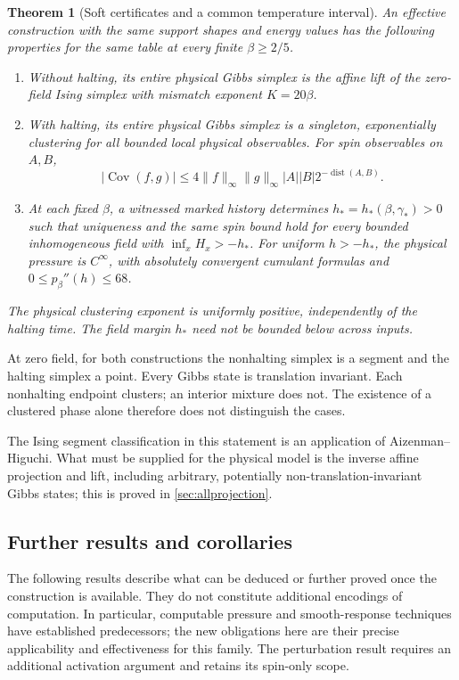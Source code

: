 \documentclass[11pt,reqno]{amsart}
\numberwithin{equation}{section}
\newtheorem{theorem}{Theorem}[section]
\theoremstyle{definition}
\theoremstyle{remark}
\newcommand{\Cov}{\operatorname{Cov}}
\newcommand{\dist}{\operatorname{dist}}
\newcommand{\norm}[1]{\lVert#1\rVert}
\begin{document}
\begin{theorem}[Soft certificates and a common temperature interval]\label{thm:soft}
An effective construction with the same support shapes and energy values has the following properties for the \emph{same table} at every finite $\beta\geq2/5$.
\begin{enumerate}
\item Without halting, its entire physical Gibbs simplex is the affine lift of the zero-field Ising simplex with mismatch exponent $K=20\beta$.
\item With halting, its entire physical Gibbs simplex is a singleton, exponentially clustering for all bounded local physical observables. For spin observables on $A,B$,
\begin{equation}\label{eq:maincov}
 |\Cov(f,g)|\leq4\norm f_\infty\norm g_\infty |A||B|2^{-\dist(A,B)}.
\end{equation}
\item At each fixed $\beta$, a witnessed marked history determines $h_*=h_*(\beta,\gamma_*)>0$ such that uniqueness and the same spin bound hold for every bounded inhomogeneous field with $\inf_x H_x>-h_*$. For uniform $h>-h_*$, the physical pressure is $C^\infty$, with absolutely convergent cumulant formulas and $0\leq p_\beta''(h)\leq68$.
\end{enumerate}
The physical clustering exponent is uniformly positive, independently of the halting time. The field margin $h_*$ need not be bounded below across inputs.
\end{theorem}

At zero field, for both constructions the nonhalting simplex is a segment and the halting simplex a point. Every Gibbs state is translation invariant. Each nonhalting endpoint clusters; an interior mixture does not. The existence of a clustered phase alone therefore does not distinguish the cases.

The Ising segment classification in this statement is an application of Aizenman--Higuchi. What must be supplied for the physical model is the inverse affine projection and lift, including arbitrary, potentially non-translation-invariant Gibbs states; this is proved in \cref{sec:allprojection}.

\subsection{Further results and corollaries}
The following results describe what can be deduced or further proved once the construction is available. They do not constitute additional encodings of computation. In particular, computable pressure and smooth-response techniques have established predecessors; the new obligations here are their precise applicability and effectiveness for this family. The perturbation result requires an additional activation argument and retains its spin-only scope.
\end{document}
